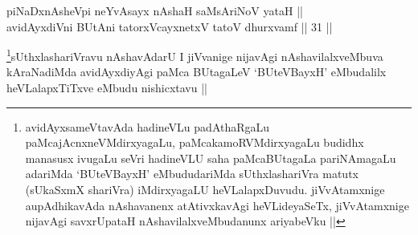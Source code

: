 
\begin{shl}
piNaDxnAsheV\s pi neYvAsayx nAshaH saMsAriNoV yataH || \\
avidAyxdiVni BUtAni tatorxVcayxnetxV tatoV dhurxvamf ||  31 ||  
\end{shl}

\begin{artha}
\footnote[1]{avidAyxsameVtavAda hadineVLu padAthaRgaLu
paMcajAcnxneVMdirxyagaLu, paMcakamoRVMdirxyagaLu budidhx manasusx
ivugaLu seVri hadineVLU saha paMcaBUtagaLa pariNAmagaLu adariMda
`BUteVBayxH' eMbududariMda sUthxlashariVra matutx (sUkaSxmX
shariVra) iMdirxyagaLU heVLalapxDuvudu. jiVvAtamxnige aupAdhikavAda
nAshavanenx atAtivxkavAgi heVLideyaSeTx, jiVvAtamxnige nijavAgi
savxrUpataH nAshavilalxveMbudanunx ariyabeVku ||}sUthxlashariVravu nAshavAdarU I jiVvanige nijavAgi
nAshavilalxveMbuva kAraNadiMda avidAyxdiyAgi paMca BUtagaLeV
`BUteVBayxH' eMbudalilx heVLalapxTiTxve eMbudu nishicxtavu ||
\end{artha}
